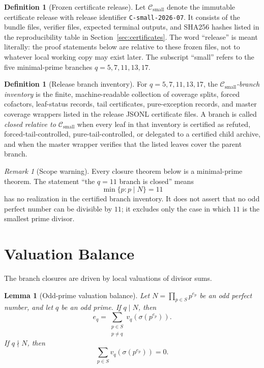 \documentclass[11pt]{article}
\newtheorem{lemma}[theorem]{Lemma}
\theoremstyle{definition}
\newtheorem{definition}[theorem]{Definition}
\theoremstyle{remark}
\newtheorem{remark}[theorem]{Remark}
\newcommand{\Csmall}{\ensuremath{\mathcal C_{\mathrm{small}}}}
\begin{document}
\begin{definition}[Frozen certificate release]
\label{def:frozen-certificate-release}
Let \(\Csmall\) denote the immutable certificate release with release identifier
\texttt{C-small-2026-07}.  It consists of the bundle files, verifier files,
expected terminal outputs, and SHA256 hashes listed in the reproducibility
table in Section~\ref{sec:certificates}.  The word ``release'' is meant
literally: the proof statements below are relative to these frozen files, not
to whatever local working copy may exist later.  The subscript ``small'' refers
to the five minimal-prime branches \(q=5,7,11,13,17\).
\end{definition}

\begin{definition}[Release branch inventory]
\label{def:release-branch-inventory}
For \(q=5,7,11,13,17\), the \emph{\(\Csmall\)-branch inventory} is the
finite, machine-readable collection of coverage splits, forced cofactors,
leaf-status records, tail certificates, pure-exception records, and master
coverage wrappers listed in the release JSONL certificate files.  A branch is
called \emph{closed relative to \(\Csmall\)} when every leaf in that
inventory is certified as refuted, forced-tail-controlled, pure-tail-controlled,
or delegated to a certified child archive, and when the master wrapper verifies
that the listed leaves cover the parent branch.
\end{definition}

\begin{remark}[Scope warning]
\label{rem:scope-warning}
Every closure theorem below is a minimal-prime theorem.  The statement
``the \(q=11\) branch is closed'' means
\[
  \min\{p:p\mid N\}=11
\]
has no realization in the certified branch inventory.  It does not assert that
no odd perfect number can be divisible by \(11\); it excludes only the case in
which \(11\) is the smallest prime divisor.
\end{remark}

\section{Valuation Balance}
\label{sec:valuation-balance}

The branch closures are driven by local valuations of divisor sums.

\begin{lemma}[Odd-prime valuation balance]
\label{lem:odd-prime-valuation-balance}
Let \(N=\prod_{p\in S}p^{e_p}\) be an odd perfect number, and let \(q\) be an
odd prime.  If \(q\mid N\), then
\[
  e_q
  =
  \sum_{\substack{p\in S\\p\ne q}}
  v_q(\sigma(p^{e_p})).
\]
If \(q\nmid N\), then
\[
  \sum_{p\in S}v_q(\sigma(p^{e_p}))=0.
\]
\end{lemma}
\end{document}
